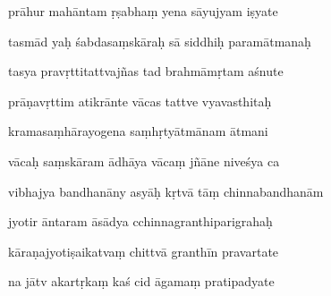 \documentclass[article,12pt,a4paper]{memoir}%
\newcounter{parCount}
\begin{document}
	  
	  \pstart \leavevmode%
	prāhur mahāntam ṛṣabhaṃ yena sāyujyam iṣyate 
	{}
	\pend%
      

	  
	  \pstart {} tasmād yaḥ śabdasaṃskāraḥ sā siddhiḥ paramātmanaḥ 
	{}
	\pend%
      

	  
	  \pstart \leavevmode%
	tasya pravṛttitattvajñas tad brahmāmṛtam aśnute 
	{}
	\pend%
      

	  
	  \pstart {} prāṇavṛttim atikrānte vācas tattve vyavasthitaḥ 
	{}
	\pend%
      

	  
	  \pstart \leavevmode%
	kramasaṃhārayogena saṃhṛtyātmānam ātmani 
	{}
	\pend%
      

	  
	  \pstart {} vācaḥ saṃskāram ādhāya vācaṃ jñāne niveśya ca 
	{}
	\pend%
      

	  
	  \pstart \leavevmode%
	vibhajya bandhanāny asyāḥ kṛtvā tāṃ chinnabandhanām 
	{}
	\pend%
      

	  
	  \pstart {} jyotir āntaram āsādya cchinnagranthiparigrahaḥ 
	{}
	\pend%
      

	  
	  \pstart \leavevmode%
	kāraṇajyotiṣaikatvaṃ chittvā granthīn pravartate 
	{}
	\pend%
      

	  
	  \pstart {} na jātv akartṛkaṃ kaś cid āgamaṃ pratipadyate 
	{}
	\pend%
      
\end{document}
